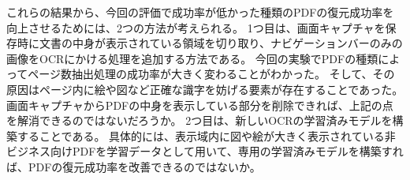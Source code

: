これらの結果から、今回の評価で成功率が低かった種類のPDFの復元成功率を向上させるためには、2つの方法が考えられる。
1つ目は、画面キャプチャを保存時に文書の中身が表示されている領域を切り取り、ナビゲーションバーのみの画像をOCRにかける処理を追加する方法である。
今回の実験でPDFの種類によってページ数抽出処理の成功率が大きく変わることがわかった。
そして、その原因はページ内に絵や図など正確な識字を妨げる要素が存在することであった。
画面キャプチャからPDFの中身を表示している部分を削除できれば、上記の点を解消できるのではないだろうか。
2つ目は、新しいOCRの学習済みモデルを構築することである。
具体的には、表示域内に図や絵が大きく表示されている非ビジネス向けPDFを学習データとして用いて、専用の学習済みモデルを構築すれば、PDFの復元成功率を改善できるのではないか。